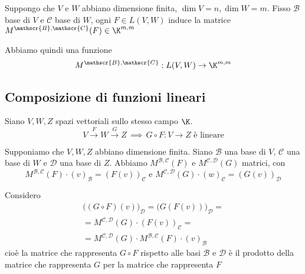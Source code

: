 Suppongo che $ V $ e $ W $ abbiano dimensione finita, $ \dim V=n, \dim W=m $. Fisso $ \mathscr{B} $ base di $ V $ e $ \mathscr{C} $ base di $ W $, ogni $ F \in L(V,W) $ induce la matrice $ M^{ \mathscr{B}, \mathscr{C}}(F) \in \K^{m,m} $

Abbiamo quindi una funzione \[
    M^{ \mathscr{B}, \mathscr{C}}:L(V,W)\to \K^{m,m}
\]

\subsection{Composizione di funzioni lineari}

Siano $ V, W, Z $ spazi vettoriali sullo stesso campo $ \K $.
\[
    V \xrightarrow{F} W \xrightarrow{G} Z \,\implies\, G\circ F:V\to Z \text{ è lineare}
\]

Supponiamo che $ V, W, Z $ abbiano dimensione finita. Siano $ \mathscr{B} $ una base di $ V $, $ \mathscr{C} $ una base di $ W $ e $ \mathscr{D} $ una base di $ Z $. Abbiamo $ M^{ \mathscr{B}, \mathscr{C}}(F) $ e $ M^{ \mathscr{C}, \mathscr{D}}(G) $ matrici, con \[M^{ \mathscr{B}, \mathscr{C}}(F) \cdot  (v)_{ \mathscr{B}}=(F(v))_{ \mathscr{C}}\text{ e }M^{ \mathscr{C}, \mathscr{D}}(G) \cdot  (w)_{ \mathscr{C}}=(G(v))_{ \mathscr{D}}\]

Considero \begin{multline*}
    \bigl((G\circ F)(v)\bigr)_{ \mathscr{D}}=\bigl(G(F(v))\bigr)_{ \mathscr{D}}=\\
    =M^{ \mathscr{C}, \mathscr{D}}(G) \cdot (F(v))_{ \mathscr{C}}=\\=M^{ \mathscr{C}, \mathscr{D}}(G) \cdot M^{ \mathscr{B}, \mathscr{C}}(F) \cdot (v)_{ \mathscr{B}}
\end{multline*} 
cioè la matrice che rappresenta $ G\circ F $ rispetto alle basi $  \mathscr{B} $ e $ \mathscr{D} $ è il prodotto della matrice che rappresenta $ G $ per la matrice che rappresenta $ F $

